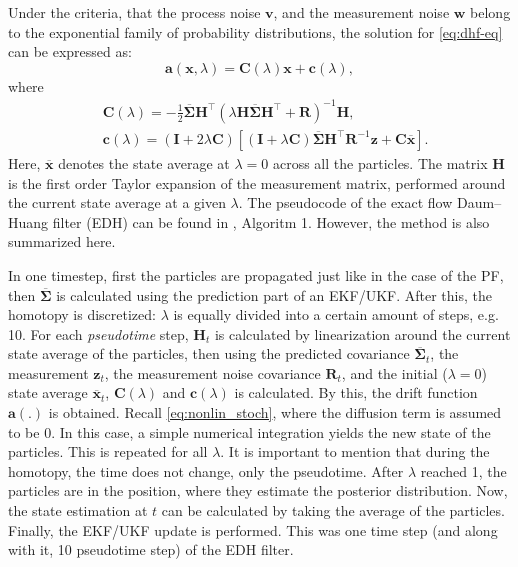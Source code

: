 Under the criteria, that the process noise $\mathbf{v}$, and the measurement noise $\mathbf{w}$ belong to the exponential family of probability distributions, the solution for \eqref{eq:dhf-eq} can be expressed as:
\begin{equation}\label{key}
    \mathbf{a}(\mathbf{x},\lambda) = \mathbf{C}(\lambda)\mathbf{x} + \mathbf{c}(\lambda),
\end{equation}
where
\begin{align}\label{eq:edh_inv}
     & \mathbf{C}(\lambda) = -\frac{1}{2}\mathbf{\mathbf{\overline\Sigma}}\mathbf{H}^\top\left(\lambda\mathbf{H}\mathbf{\overline\Sigma}\mathbf{H}^\top + \mathbf{R}\right)^{-1}\mathbf{H},                                      \\
     & \mathbf{c}(\lambda) = \left(\mathbf{I}+2\lambda\mathbf{C}\right)\left[\left(\mathbf{I}+\lambda\mathbf{C}\right)\mathbf{\overline\Sigma}\mathbf{H}^\top\mathbf{R}^{-1}\mathbf{z} + \mathbf{C}\overline{\mathbf{x}}\right].
\end{align}
Here, $\overline{\mathbf{x}}$ denotes the state average at $\lambda = 0$ across all the particles. The matrix $\mathbf{H}$ is the first order Taylor expansion of the measurement matrix, performed around the current state average at a given $\lambda$. The pseudocode of the exact flow Daum--Huang filter (EDH) can be found in \cite{EDH-Coates}, Algoritm 1. However, the method is also summarized here.

In one timestep, first the particles are propagated just like in the case of the PF, then $\overline{\mathbf{\Sigma}}$ is calculated using the prediction part of an EKF/UKF.  After this, the homotopy is discretized: $\lambda$ is equally divided into a certain amount of steps, e.g. 10. For each \emph{pseudotime} step, $\mathbf{H}_t$ is calculated  by linearization around the current state average of the particles, then using the predicted covariance $\overline{\mathbf{\Sigma}}_t$, the measurement $\mathbf{z}_t$, the measurement noise covariance $\mathbf{R}_t$, and the initial ($\lambda = 0$) state average $\overline{\mathbf{x}}_t$, $\mathbf{C}(\lambda)$ and $\mathbf{c}(\lambda)$ is calculated. By this, the drift function $\mathbf{a}(.)$ is obtained. Recall \eqref{eq:nonlin_stoch}, where the diffusion term is assumed to be 0. In this case, a simple numerical integration yields the new state of the particles. This is repeated for all $\lambda$. It is important to mention that during the homotopy, the time does not change, only the pseudotime. After $\lambda$ reached 1, the particles are in the position, where they estimate the posterior distribution. Now, the state estimation at $t$ can be calculated by taking the average of the particles. Finally, the EKF/UKF update is performed. This was one time step (and along with it, 10 pseudotime step) of the EDH filter.

